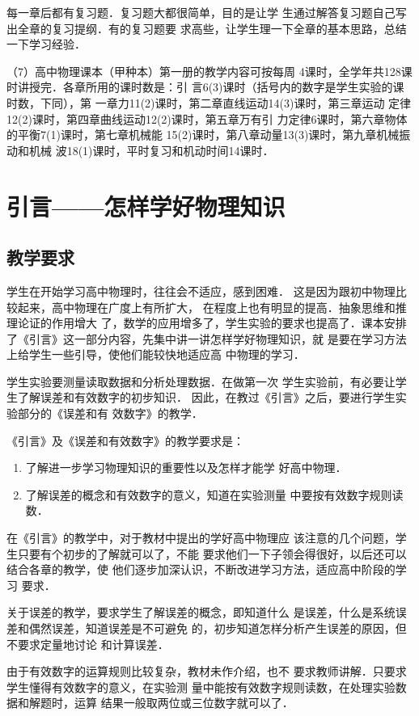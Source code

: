 每一章后都有复习题．复习题大都很简单，目的是让学
生通过解答复习题自己写出全章的复习提纲．有的复习题要
求高些，让学生理一下全章的基本思路，总结一下学习经验．

（7）高中物理课本（甲种本）第一册的教学内容可按每周
4课时，全学年共128课时讲授完．各章所用的课时数是：引
言6(3)课时（括号内的数字是学生实验的课时数，下同），第
一章力11(2)课时，第二章直线运动14(3)课时，第三章运动
定律12(2)课时，第四章曲线运动12(2)课时，第五章万有引
力定律6课时，第六章物体的平衡7(1)课时，第七章机械能
15(2)课时，第八章动量13(3)课时，第九章机械振动和机械
波18(1)课时，平时复习和机动时间14课时．

\chapter{引言——怎样学好物理知识}
\minitoc[n]
\section{教学要求}
学生在开始学习高中物理时，往往会不适应，感到困难．
这是因为跟初中物理比较起来，高中物理在广度上有所扩大，
在程度上也有明显的提高．抽象思维和推理论证的作用增大
了，数学的应用增多了，学生实验的要求也提高了．课本安排
了《引言》这一部分内容，先集中讲一讲怎样学好物理知识，就
是要在学习方法上给学生一些引导，使他们能较快地适应高
中物理的学习．

学生实验要测量读取数据和分析处理数据．在做第一次
学生实验前，有必要让学生了解误差和有效数字的初步知识．
因此，在教过《引言》之后，要进行学生实验部分的《误差和有
效数字》的教学．

《引言》及《误差和有效数字》的教学要求是：
\begin{enumerate}
    \item 了解进一步学习物理知识的重要性以及怎样才能学
好高中物理．
\item 了解误差的概念和有效数字的意义，知道在实验测量
中要按有效数字规则读数．
\end{enumerate}

在《引言》的教学中，对于教材中提出的学好高中物理应
该注意的几个问题，学生只要有个初步的了解就可以了，不能
要求他们一下子领会得很好，以后还可以结合各章的教学，使
他们逐步加深认识，不断改进学习方法，适应高中阶段的学习
要求．

关于误差的教学，要求学生了解误差的概念，即知道什么
是误差，什么是系统误差和偶然误差，知道误差是不可避免
的，初步知道怎样分析产生误差的原因，但不要求定量地讨论
和计算误差．

由于有效数字的运算规则比较复杂，教材未作介绍，也不
要求教师讲解．只要求学生懂得有效数字的意义，在实验测
量中能按有效数字规则读数，在处理实验数据和解题时，运算
结果一般取两位或三位数字就可以了．

